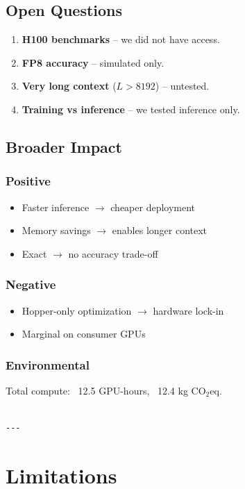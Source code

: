 \subsection{Open Questions}

\begin{enumerate}
\item \textbf{H100 benchmarks} -- we did not have access.
\item \textbf{FP8 accuracy} -- simulated only.
\item \textbf{Very long context} ($L > 8192$) -- untested.
\item \textbf{Training vs inference} -- we tested inference only.

\end{enumerate}
\subsection{Broader Impact}

\subsubsection{Positive}
\begin{itemize}
\item Faster inference $\to$ cheaper deployment
\item Memory savings $\to$ enables longer context
\item Exact $\to$ no accuracy trade-off

\end{itemize}
\subsubsection{Negative}
\begin{itemize}
\item Hopper-only optimization $\to$ hardware lock-in
\item Marginal on consumer GPUs

\end{itemize}
\subsubsection{Environmental}
Total compute: ~12.5 GPU-hours, ~12.4 kg CO$_2$eq.
\begin{lstlisting}

---
\end{lstlisting}

\section{Limitations}

